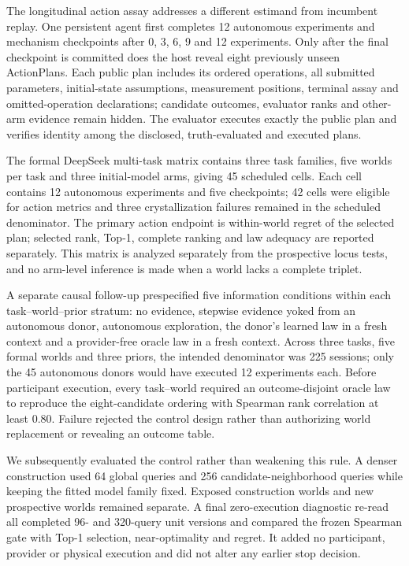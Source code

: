 \documentclass[10pt,twocolumn]{article}
\begin{document}
The longitudinal action assay addresses a different estimand from
incumbent replay. One persistent agent first completes 12 autonomous
experiments and mechanism checkpoints after 0, 3, 6, 9 and 12
experiments. Only after the final checkpoint is committed does the host
reveal eight previously unseen ActionPlans. Each public plan includes
its ordered operations, all submitted parameters, initial-state
assumptions, measurement positions, terminal assay and omitted-operation
declarations; candidate outcomes, evaluator ranks and other-arm evidence
remain hidden. The evaluator executes exactly the public plan and
verifies identity among the disclosed, truth-evaluated and executed
plans.

The formal DeepSeek multi-task matrix contains three task families, five
worlds per task and three initial-model arms, giving 45 scheduled cells.
Each cell contains 12 autonomous experiments and five checkpoints; 42
cells were eligible for action metrics and three crystallization
failures remained in the scheduled denominator. The primary action
endpoint is within-world regret of the selected plan; selected rank,
Top-1, complete ranking and law adequacy are reported separately. This
matrix is analyzed separately from the prospective locus tests, and no
arm-level inference is made when a world lacks a complete triplet.

A separate causal follow-up prespecified five information conditions
within each task--world--prior stratum: no evidence, stepwise evidence
yoked from an autonomous donor, autonomous exploration, the donor's
learned law in a fresh context and a provider-free oracle law in a fresh
context. Across three tasks, five formal worlds and three priors, the
intended denominator was 225 sessions; only the 45 autonomous donors
would have executed 12 experiments each. Before participant execution,
every task--world required an outcome-disjoint oracle law to reproduce
the eight-candidate ordering with Spearman rank correlation at least
0.80. Failure rejected the control design rather than authorizing world
replacement or revealing an outcome table.

We subsequently evaluated the control rather than weakening this rule. A
denser construction used 64 global queries and 256
candidate-neighborhood queries while keeping the fitted model family
fixed. Exposed construction worlds and new prospective worlds remained
separate. A final zero-execution diagnostic re-read all completed 96-
and 320-query unit versions and compared the frozen Spearman gate with
Top-1 selection, near-optimality and regret. It added no participant,
provider or physical execution and did not alter any earlier stop
decision.
\end{document}
